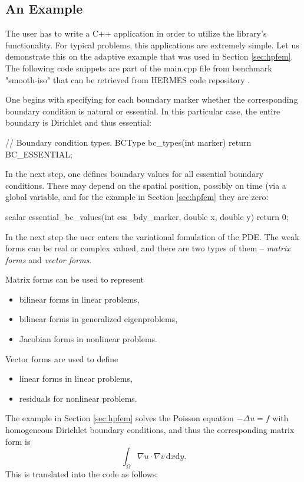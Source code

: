 \documentclass[final,3p,times,twocolumn]{elsarticle}
\begin{document}
\subsection{An Example}

The user has to write a C++ application in order to utilize 
the library's functionality. For typical problems, this 
applications are extremely simple. Let us demonstrate this on 
the adaptive example that was used in Section \ref{sec:hpfem}.
The following code snippets are part of the main.cpp file 
from benchmark "smooth-iso" that can be retrieved from HERMES
code repository \cite{hermes-repo}. 

One begins with specifying for each boundary marker whether the 
corresponding boundary condition is natural or essential. In 
this particular case, the entire boundary is Dirichlet and thus 
essential:

\begin{code}
// Boundary condition types.
BCType bc_types(int marker)
{
  return BC_ESSENTIAL;
}
\end{code}
In the next step, one defines boundary values for all 
essential boundary conditions. These may depend on the 
spatial position, possibly on time (via a global variable,
and for the example in Section \ref{sec:hpfem} 
they are zero:

\begin{code}
scalar essential_bc_values(int ess_bdy_marker, 
                           double x, double y)
{
  return 0;
}
\end{code}
In the next step the user enters the variational fomulation
of the PDE. The weak forms can be real or complex valued,
and there are two types of them -- {\em matrix forms} and
{\em vector forms}. 

Matrix forms can be used to represent 
\begin{itemize}
\item bilinear forms in linear problems, 
\item bilinear forms in generalized eigenproblems,
\item Jacobian forms in nonlinear problems.
\end{itemize}
Vector forms are used to define

\begin{itemize}
\item linear forms in linear problems,
\item residuals for nonlinear problems.
\end{itemize}
The example in Section \ref{sec:hpfem} 
solves the Poisson equation $-\Delta u = f$
with homogeneous Dirichlet boundary conditions,
and thus the corresponding matrix form is 
$$
\int_{\Omega} \nabla u \cdot \nabla v \, \mbox{d}x\mbox{d}y.
$$
This is translated into the code as follows:
\end{document}
